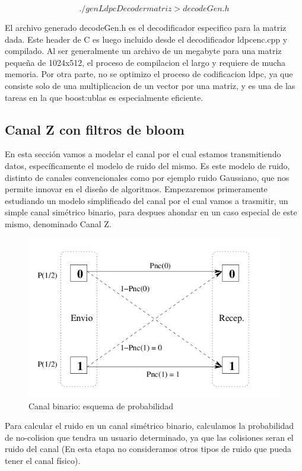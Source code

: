 \documentclass[12pt,twoside,openright]{moddalthesis}
\begin{document}
$$ ./genLdpcDecoder matriz  > decodeGen.h $$

El archivo generado decodeGen.h es el decodificador especifico para la matriz dada. Este header de C es luego incluido desde el decodificador ldpcenc.cpp y compilado. Al ser generalmente un archivo de un megabyte para una matriz pequeña de 1024x512, el proceso de compilacion el largo y requiere de mucha memoria.
Por otra parte, no se optimizo el proceso de codificacion ldpc, ya que consiste solo de una multiplicacion de un vector por una matriz, y es una de las tareas en la que boost:ublas es especialmente eficiente.

\subsection{Canal Z con filtros de bloom}
En esta sección vamos a modelar el canal por el cual estamos transmitiendo datos, específicamente el modelo de ruido del mismo. Es este modelo de ruido, distinto de canales convencionales como por ejemplo ruido Gaussiano, que nos permite innovar en el diseño de algoritmos.
Empezaremos primeramente estudiando un modelo simplificado del canal por el cual vamos a trasmitir, un simple canal simétrico binario, para despues ahondar en un caso especial de este mismo, denominado Canal Z.
\begin{figure}[t]
  \begin{center}
    \includegraphics[scale=0.43]{capacidad/canalBinario.png}
  \end{center}
\caption {Canal binario: esquema de probabilidad}
\label{fig:canbin}
\end{figure}

Para calcular el ruido en un canal simétrico binario, calculamos la probabilidad de no-colision que tendra un usuario determinado, ya que las colisiones seran el ruido del canal (En esta etapa no consideramos otros tipos de ruido que pueda tener el canal físico).
\end{document}
